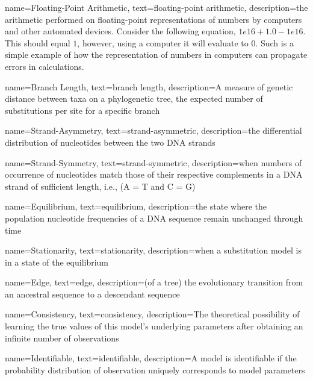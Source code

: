 \makeglossaries

{
        name=Floating-Point Arithmetic,
        text=floating-point arithmetic,
        description={the arithmetic performed on floating-point representations of numbers by computers and other automated devices.  Consider the following equation, $1e16 + 1.0 - 1e16$. This should equal $1$, however, using a computer it will evaluate to $0$. Such is a simple example of how the representation of numbers in computers can propagate errors in calculations.}
}


{
        name=Branch Length,
        text=branch length,
        description={A measure of genetic distance between taxa on a phylogenetic tree, the expected number of substitutions per site for a specific branch}
}


{
        name=Strand-Asymmetry,
        text={strand-asymmetric},
        description={the differential distribution of nucleotides between the two DNA strands}
}

{
        name=Strand-Symmetry,
        text=strand-symmetric,
        description={when numbers of occurrence of nucleotides match those of their respective complements in a DNA strand of sufficient length, i.e., (A = T and C = G)}
}


{
        name=Equilibrium,
        text=equilibrium,
        description={the state where the population nucleotide frequencies of a DNA sequence remain unchanged through time}
}

{
        name=Stationarity,
        text=stationarity,
        description={when a substitution model is in a state of the \gls{equilibrium}}
}


{
        name=Edge,
        text=edge,
        description={(of a tree) the evolutionary transition from an ancestral sequence to a descendant sequence}
}

{
        name=Consistency,
        text=consistency,
        description={The theoretical possibility of learning the true values of this model's underlying parameters after obtaining an infinite number of observations}
}

{
        name=Identifiable,
        text=identifiable,
        description={A model is identifiable if the probability distribution of observation uniquely corresponds to model parameters}
}


